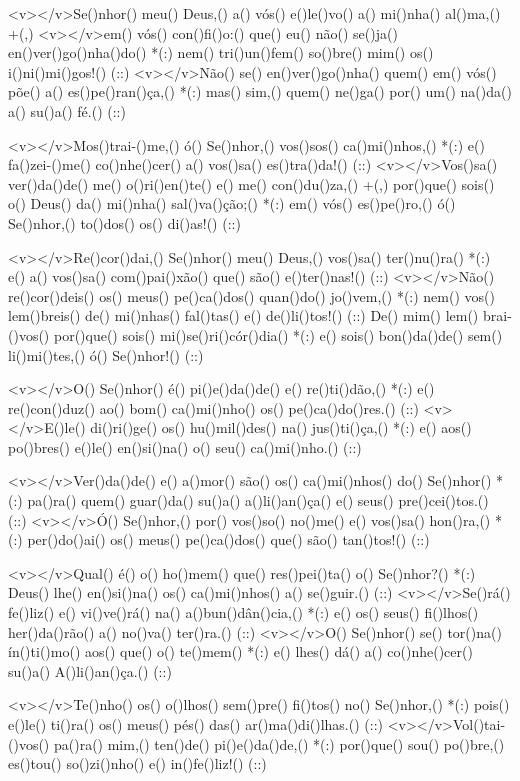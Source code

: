 <v></v>Se()nhor() meu() Deus,() a() vós() e()le()vo() a() mi()nha() al()ma,() +(,)
<v></v>em() vós() con()fi()o:() que() eu() não() se()ja() en()ver()go()nha()do() *(:)
nem() tri()un()fem() so()bre() mim() os() i()ni()mi()gos!() (::)
<v></v>Não() se() en()ver()go()nha() quem() em() vós() põe() a() es()pe()ran()ça,() *(:)
mas() sim,() quem() ne()ga() por() um() na()da() a() su()a() fé.() (::)

<v></v>Mos()trai-()me,() ó() Se()nhor,() vos()sos() ca()mi()nhos,() *(:)
e() fa()zei-()me() co()nhe()cer() a() vos()sa() es()tra()da!() (::)
<v></v>Vos()sa() ver()da()de() me() o()ri()en()te() e() me() con()du()za,() +(,)
por()que() sois() o() Deus() da() mi()nha() sal()va()ção;() *(:)
em() vós() es()pe()ro,() ó() Se()nhor,() to()dos() os() di()as!() (::)

<v></v>Re()cor()dai,() Se()nhor() meu() Deus,() vos()sa() ter()nu()ra() *(:)
e() a() vos()sa() com()pai()xão() que() são() e()ter()nas!() (::)
<v></v>Não() re()cor()deis() os() meus() pe()ca()dos() quan()do() jo()vem,() *(:)
nem() vos() lem()breis() de() mi()nhas() fal()tas() e() de()li()tos!() (::)
De() mim() lem() brai-()vos() por()que() sois() mi()se()ri()cór()dia() *(:)
e() sois() bon()da()de() sem() li()mi()tes,() ó() Se()nhor!() (::)

<v></v>O() Se()nhor() é() pi()e()da()de() e() re()ti()dão,() *(:)
e() re()con()duz() ao() bom() ca()mi()nho() os() pe()ca()do()res.() (::)
<v></v>E()le() di()ri()ge() os() hu()mil()des() na() jus()ti()ça,() *(:)
e() aos() po()bres() e()le() en()si()na() o() seu() ca()mi()nho.() (::)

<v></v>Ver()da()de() e() a()mor() são() os() ca()mi()nhos() do() Se()nhor() *(:)
pa()ra() quem() guar()da() su()a() a()li()an()ça() e() seus() pre()cei()tos.() (::)
<v></v>Ó() Se()nhor,() por() vos()so() no()me() e() vos()sa() hon()ra,() *(:)
per()do()ai() os() meus() pe()ca()dos() que() são() tan()tos!() (::)

<v></v>Qual() é() o() ho()mem() que() res()pei()ta() o() Se()nhor?() *(:)
Deus() lhe() en()si()na() os() ca()mi()nhos() a() se()guir.() (::)
<v></v>Se()rá() fe()liz() e() vi()ve()rá() na() a()bun()dân()cia,() *(:)
e() os() seus() fi()lhos() her()da()rão() a() no()va() ter()ra.() (::)
<v></v>O() Se()nhor() se() tor()na() ín()ti()mo() aos() que() o() te()mem() *(:)
e() lhes() dá() a() co()nhe()cer() su()a() A()li()an()ça.() (::)

<v></v>Te()nho() os() o()lhos() sem()pre() fi()tos() no() Se()nhor,() *(:)
pois() e()le() ti()ra() os() meus() pés() das() ar()ma()di()lhas.() (::)
<v></v>Vol()tai-()vos() pa()ra() mim,() ten()de() pi()e()da()de,() *(:)
por()que() sou() po()bre,() es()tou() so()zi()nho() e() in()fe()liz!() (::)


